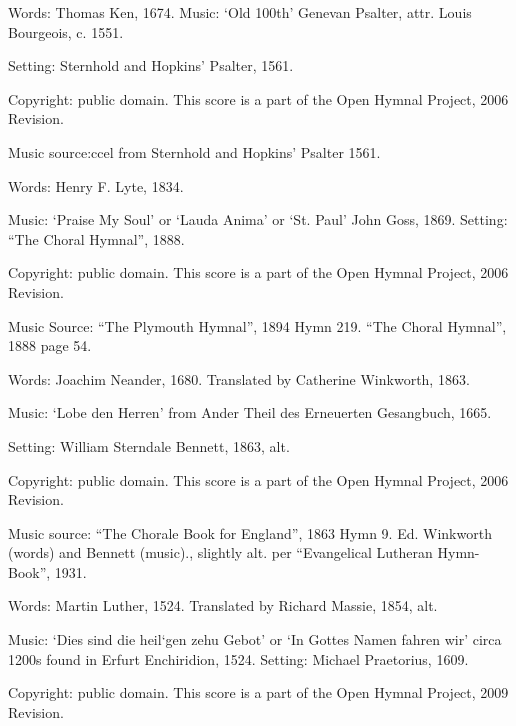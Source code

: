 \begin{multicols}{2}
\par\noindent
Words: Thomas Ken, 1674.  Music: `Old 100th' Genevan Psalter, attr. Louis Bourgeois, c. 1551.  
\par\noindent
Setting: Sternhold and Hopkins' Psalter, 1561.
\par\noindent
Copyright: public domain. This score is a part of the Open Hymnal Project, 2006 Revision.
\par\noindent
Music source:ccel from Sternhold and Hopkins' Psalter 1561.

\par\noindent
Words: Henry F. Lyte, 1834. 
\par\noindent
Music: `Praise My Soul' or `Lauda Anima' or `St. Paul' John Goss, 1869.  Setting: ``The Choral Hymnal'', 1888.
\par\noindent
Copyright: public domain. This score is a part of the Open Hymnal Project, 2006 Revision.
\par\noindent
Music Source: ``The Plymouth Hymnal'', 1894 Hymn 219.  ``The Choral Hymnal'', 1888 page 54.

\par\noindent
Words: Joachim Neander, 1680. Translated by Catherine Winkworth, 1863. 
\par\noindent
Music: `Lobe den Herren' from Ander Theil des Erneuerten Gesangbuch, 1665.
\par\noindent
Setting: William Sterndale Bennett, 1863, alt. 
\par\noindent
Copyright: public domain. This score is a part of the Open Hymnal Project, 2006 Revision.
\par\noindent
Music source: ``The Chorale Book for England'', 1863 Hymn 9.  Ed. Winkworth (words) and Bennett (music)., slightly alt. per ``Evangelical Lutheran Hymn-Book'', 1931.

\par\noindent
Words: Martin Luther, 1524.  Translated by Richard Massie, 1854, alt. 
\par\noindent
Music: `Dies sind die heil`gen zehu Gebot' or `In Gottes Namen fahren wir' circa 1200s found in Erfurt Enchiridion, 1524.  Setting: Michael Praetorius, 1609.
\par\noindent
Copyright: public domain. This score is a part of the Open Hymnal Project, 2009 Revision.


\end{multicols}
